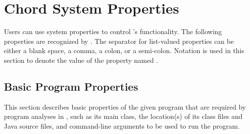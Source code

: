 
\section{Chord System Properties}
\label{sec:chord-sysprops}

Users can use system properties to control \Chord's functionality.
The following properties are recognized by \Chord.
The separator for list-valued properties can be either a blank space, a comma, a colon, or a semi-colon.
Notation \code{[<...>]} is used in this section to denote the value of the property named .

\subsection{Basic Program Properties}

This section describes basic properties of the given program that are required by program analyses in \Chord,
such as its main class, the location(s) of its class files and Java source files, and command-line arguments
to be used to run the program.

